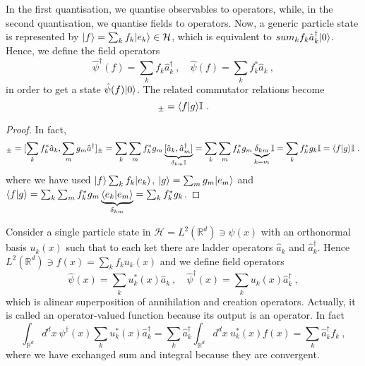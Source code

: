     In the first quantisation, we quantise observables to operators, while, in the second quantisation, we quantise fields to operators. Now, a generic particle state is represented by $\vert f\rangle = \sum_k f_k \vert e_k\rangle \in \mathcal H$, which is equivalent to $sum_k f_k \hat a_k^\dagger \vert0\rangle$. Hence, we define the field operators
    \begin{equation*}
        \hat \psi^\dagger (f) = \sum_k f_k \hat a^\dagger_k ~, \quad \hat \psi (f) = \sum_k f_k^* \hat a_k ~,
    \end{equation*}
    in order to get a state $\hat \psi (f) \vert0\rangle$. The related commutator relations become
    \begin{equation*}
        [\hat \psi (f), \hat \psi^\dagger (g)]_\pm = \braket{f}{g}\mathbb I ~.
    \end{equation*}
    \begin{proof}
        In fact,
        \begin{equation*}
            [\hat \psi (f), \hat \psi^\dagger (g)]_\pm = [\sum_k f^*_k \hat a_k, \sum_m g_m \hat a^\dagger]_\pm = \sum_k \sum_m f^*_k g_m \underbrace{[\hat a_k, \hat a^\dagger_m]}_{\delta_{km} \mathbb I} = \sum_k \sum_m f^*_k g_m \underbrace{\delta_{km}}_{k= m} \mathbb I = \sum_k f^*_k g_k \mathbb I = \braket{f}{g} \mathbb I ~.
        \end{equation*}
        where we have used $\vert f\rangle \sum_k f_k \vert e_k\rangle$, $\vert g\rangle = \sum_m g_m \vert e_m\rangle$ and $\langle f\vert g\rangle = \sum_k \sum_m f^*_k g_m \underbrace{\langle e_k\vert e_m\rangle}_{\delta_{km}} = \sum_k f^*_k g_k$.
    \end{proof}

    Consider a single particle state in $\mathcal H = L^2(\mathbb R^d) \ni \psi(x)$ with an orthonormal basis $u_k(x)$ such that to each ket there are ladder operators $\hat a_k$ and $\hat a_k^\dagger$. Hence $L^2(\mathbb R^d) \ni f(x) = \sum_k f_k u_k(x)$ and we define field operators
    \begin{equation*}
        \hat \psi(x) = \sum_k u_k^* (x) \hat a_k ~, \quad \hat \psi^\dagger (x) = \sum_k u_k (x) \hat a_k^\dagger ~,
    \end{equation*}
    which is alinear superposition of annihilation and creation operators. Actually, it is called an operator-valued function because its output is an operator. In fact 
    \begin{equation*}
        \int_{\mathbb R^d} d^d x ~ \psi^\dagger (x) \sum_k u_k^* (x) \hat a_k^\dagger = \sum_k \hat a_k^\dagger \int_{\mathbb R^d} d^d x ~ u^*_k(x) f(x) = \sum_k \hat a_k^\dagger f_k~,
    \end{equation*}
    where we have exchanged sum and integral because they are convergent. 

